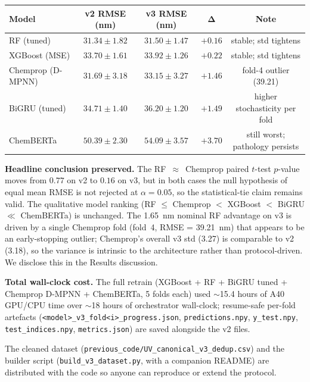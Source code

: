 \documentclass[11pt]{article}
\begin{document}
{\begin{center}\small
\begin{tabular}{lcccc}
\toprule
\textbf{Model} & \textbf{v2 RMSE (nm)} & \textbf{v3 RMSE (nm)} & $\boldsymbol{\Delta}$ & \textbf{Note} \\
\midrule
RF (tuned)           & $31.34 \pm 1.82$ & $31.50 \pm 1.47$ & $+0.16$ & stable; std tightens \\
XGBoost (MSE)        & $33.70 \pm 1.61$ & $33.92 \pm 1.26$ & $+0.22$ & stable; std tightens \\
Chemprop (D-MPNN)    & $31.69 \pm 3.18$ & $33.15 \pm 3.27$ & $+1.46$ & fold-4 outlier (39.21) \\
BiGRU (tuned)        & $34.71 \pm 1.40$ & $36.20 \pm 1.20$ & $+1.49$ & higher stochasticity per fold \\
ChemBERTa            & $50.39 \pm 2.30$ & $54.09 \pm 3.57$ & $+3.70$ & still worst; pathology persists \\
\bottomrule
\end{tabular}
\end{center}

\textbf{Headline conclusion preserved.} The RF~$\approx$~Chemprop paired $t$-test $p$-value moves from $0.77$ on v2 to $0.16$ on v3, but in both cases the null hypothesis of equal mean RMSE is not rejected at $\alpha = 0.05$, so the statistical-tie claim remains valid. The qualitative model ranking (RF $\leq$ Chemprop $<$ XGBoost $<$ BiGRU $\ll$ ChemBERTa) is unchanged. The 1.65~nm nominal RF advantage on v3 is driven by a single Chemprop fold (fold~4, RMSE = 39.21~nm) that appears to be an early-stopping outlier; Chemprop's overall v3 std (3.27) is comparable to v2 (3.18), so the variance is intrinsic to the architecture rather than protocol-driven. We disclose this in the Results discussion.

\textbf{Total wall-clock cost.} The full retrain (XGBoost + RF + BiGRU tuned + Chemprop D-MPNN + ChemBERTa, 5 folds each) used $\sim$15.4 hours of A40 GPU/CPU time over $\sim$18 hours of orchestrator wall-clock; resume-safe per-fold artefacts (\texttt{<model>\_v3\_fold<i>\_progress.json}, \texttt{predictions.npy}, \texttt{y\_test.npy}, \texttt{test\_indices.npy}, \texttt{metrics.json}) are saved alongside the v2 files.

The cleaned dataset (\texttt{previous\_code/UV\_canonical\_v3\_dedup.csv}) and the builder script (\texttt{build\_v3\_dataset.py}, with a companion README) are distributed with the code so anyone can reproduce or extend the protocol.}
\end{document}
